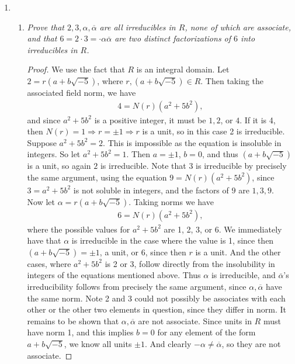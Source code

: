 \documentclass[10pt,oneside,reqno]{amsart}
\theoremstyle{plain}
\theoremstyle{definition}
\begin{document}
\begin{enumerate}
\item[]
\begin{enumerate}
\item \textit{Prove that $2,3,\alpha, \overline{\alpha}$ are all irreducibles in $R$, none of which are associate, and that $6 = 2 \cdot 3 = \cdot \alpha \overline{\alpha}$ are two distinct factorizations of $6$ into irreducibles in $R$. }
\begin{proof}
We use the fact that $R$ is an integral domain. Let $2 =r(a + b\sqrt{-5})$, where $r,(a + b\sqrt{-5}) \in R$. Then taking the associated field norm, we have
\begin{equation} 
\begin{aligned}
4 = N(r)(a^2 + 5b^2),
\end{aligned}
\end{equation}
and since $a^2 + 5b^2$ is a positive integer, it must be $1,2$, or $4$. If it is 4, then $N(r) = 1 \Rightarrow r = \pm 1 \Rightarrow r$ is a unit, so in this case 2 is irreducible. Suppose $a^2 + 5b^2 = 2$. This is impossible as the equation is insoluble in integers. So let $a^2 + 5b^2= 1$. Then $a = \pm 1$, $ b= 0$, and thus $(a + b\sqrt{-5})$ is a unit, so again $2$ is irreducible. Note that $3$ is irreducible by precisely the same argument, using the equation $9 = N(r)(a^2 + 5b^2)$, since $3 = a^2 + 5b^2$ is not soluble in integers, and the factors of $9$ are $1,3,9$. \\

Now let $\alpha = r(a + b\sqrt{-5})$. Taking norms we have
\begin{equation} 
\begin{aligned}
6 = N(r)(a^2 + 5b^2),
\end{aligned}
\end{equation}
where the possible values for $a^2 + 5b^2$ are 1, 2, 3, or 6. We immediately have that $\alpha$ is irreducible in the case where the value is 1, since then $(a + b\sqrt{-5}) = \pm 1$, a unit, or $6$, since then $r$ is a unit. And the other cases, where $a^2 + 5b^2$ is 2 or 3, follow directly from the insolubility in integers of the equations mentioned above. Thus $\alpha$ is irreducible, and $\overline{\alpha}$'s irreducibility follows from precisely the same argument, since $\alpha,\overline{\alpha}$ have the same norm. Note 2 and 3 could not possibly be associates with each other or the other two elements in question, since they differ in norm. It remains to be shown that $\alpha,\overline{\alpha}$ are not associate. Since units in $R$ must have norm 1, and this implies $b = 0$ for any element of the form $a + b\sqrt{-5}$, we know all units $\pm 1$. And clearly $-\alpha \neq \overline{\alpha}$, so they are not associate. 
\end{proof}


\end{enumerate}
\end{enumerate}
\end{document}
